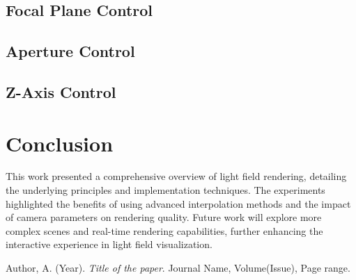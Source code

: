 \documentclass{article}
\begin{document}
\subsection{Focal Plane Control}

\subsection{Aperture Control}

\subsection{Z-Axis Control}


\section{Conclusion}
This work presented a comprehensive overview of light field rendering, detailing the underlying principles and implementation techniques. The experiments highlighted the benefits of using advanced interpolation methods and the impact of camera parameters on rendering quality. Future work will explore more complex scenes and real-time rendering capabilities, further enhancing the interactive experience in light field visualization.

\begin{thebibliography}{9}
    Author, A. (Year). 
    \textit{Title of the paper}. Journal Name, Volume(Issue), Page range.
    
\end{thebibliography}
\end{document}
